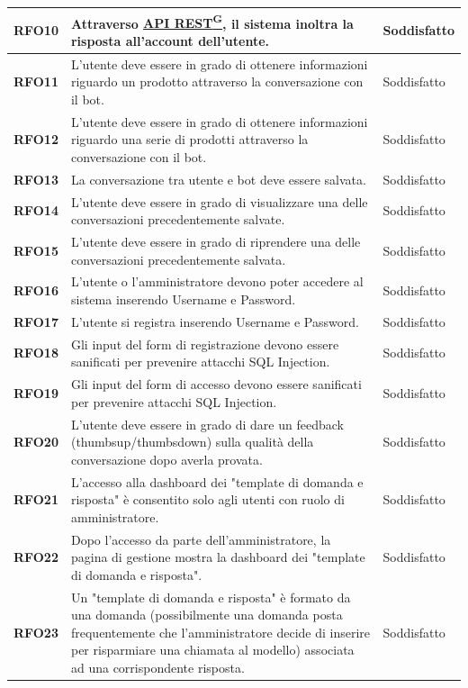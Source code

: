 \begin{longtable}{|>{\centering\arraybackslash}m{}|>{\centering\arraybackslash}m{}|>{\centering\arraybackslash}m{}|}
    \hline
    \textbf{RFO10} & Attraverso \href{https://code7crusaders.github.io/docs/PB/documentazione_interna/glossario.html#api-rest-representational-state-transfer}{API REST\textsuperscript{G}}, il sistema inoltra la risposta all'account dell’utente. & Soddisfatto \\
    \hline
    \textbf{RFO11} & L'utente deve essere in grado di ottenere informazioni riguardo un prodotto attraverso la conversazione con il bot. & Soddisfatto \\
    \hline
    \textbf{RFO12} & L'utente deve essere in grado di ottenere informazioni riguardo una serie di prodotti attraverso la conversazione con il bot. & Soddisfatto \\
    \hline
    \textbf{RFO13} & La conversazione tra utente e bot deve essere salvata. & Soddisfatto \\
    \hline
    \textbf{RFO14} & L'utente deve essere in grado di visualizzare una delle conversazioni precedentemente salvate. & Soddisfatto \\
    \hline
    \textbf{RFO15} & L'utente deve essere in grado di riprendere una delle conversazioni precedentemente salvata. & Soddisfatto \\
    \hline
    \textbf{RFO16} & L'utente o l'amministratore devono poter accedere al sistema inserendo Username e Password. & Soddisfatto \\
    \hline
    \textbf{RFO17} & L'utente si registra inserendo Username e Password. & Soddisfatto \\
    \hline
    \textbf{RFO18} & Gli input del form di registrazione devono essere sanificati per prevenire attacchi SQL Injection. & Soddisfatto \\
    \hline
    \textbf{RFO19} & Gli input del form di accesso devono essere sanificati per prevenire attacchi SQL Injection. & Soddisfatto \\
    \hline
    \textbf{RFO20} & L'utente deve essere in grado di dare un feedback (thumbsup/thumbsdown) sulla qualità della conversazione dopo averla provata. & Soddisfatto \\
    \hline
    \textbf{RFO21} & L’accesso alla dashboard dei "template di domanda e risposta" è consentito solo agli utenti con ruolo di amministratore. & Soddisfatto \\
    \hline
    \textbf{RFO22} & Dopo l’accesso da parte dell'amministratore, la pagina di gestione mostra la dashboard dei "template di domanda e risposta". & Soddisfatto \\
    \hline
    \textbf{RFO23} & Un "template di domanda e risposta" è formato da una domanda (possibilmente una domanda posta frequentemente che l'amministratore decide di inserire per risparmiare una chiamata al modello) associata ad una corrispondente risposta. & Soddisfatto \\

\end{longtable}
